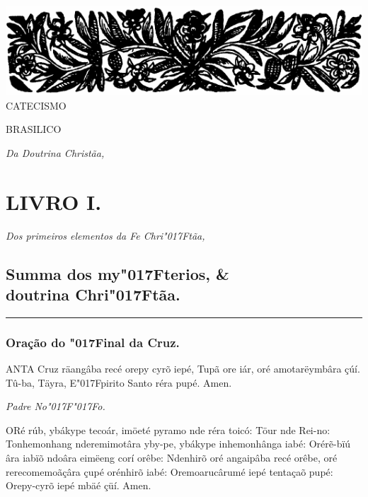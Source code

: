 \documentclass[openany,titlepage,12pt]{book}
\renewcommand{\chaptermark}[1]{\markboth{#1}{}}
\renewcommand{\sectionmark}[1]{\gdef\rightmark{#1}}
\newcommand{\lgS}{\char"017F}
\newcommand{\lgSS}{\char"017F\char"017F}
\begin{document}
\begin{center}
    \includegraphics[scale=0.36]{09.livro1.png}
    {\large CATECISMO}
    \vspace{5pt}

    {\huge BRASILICO}

    \textit{Da Doutrina Christãa,}
\end{center}
\unskip
\vspace{-30pt}
{\let\clearpage\relax \chapter{\Huge LIVRO I.}}
\unskip
\vspace{-10pt}

\begin{center}
    \textit{Dos primeiros elementos da Fe Chri\lgS tãa,}
\end{center}
\unskip\vspace{-5pt}
\section{Summa dos my\lgS terios, \& \\doutrina Chri\lgS tãa.}

\chaptermark{Summa}
\sectionmark{Da Doutrina Crhi\lgS tãa.}
\unskip\vspace{-5pt}
\par\noindent\rule{\textwidth}{0.4pt}
\unskip\vspace{5pt}
\subsection{Oração do \lgS inal da Cruz.}

\lettrine[findent =-1pt, nindent=0pt, loversize=-0.1, lraise=0.05, lines=5]
{}{A}NTA Cruz räangâba recé orepy cyrõ iepé, Tupã ore
iár, oré amotarëymbâra çúí. Tû-ba, Täyra, E\lgS pirito Santo
réra pupé. Amen. 
\unskip
\begin{center}
    \unskip
    \textit{Padre No\lgSS o.}
\end{center}
\unskip
\lettrine[findent =4pt, nindent=0pt, lines=2]
{O}{R}é rúb, ybákype tecoár, imöeté pyramo nde réra toicó: Töur
nde Rei-no: Tonhemonhang nderemimotâra yby-pe, ybákype inhemonhânga
iabé: Orérẽ-\linebreak bïú
 âra iabïõ ndoâra eimëeng corí orêbe: Ndenhirõ
oré angaipâba recé orêbe, oré rerecomemoãçâra çupé orénhirõ iabé:
Oremoarucârumé iepé tentaçaõ pupé: Orepy-cyrõ iepé mbäé çüí. Amen.
\end{document}
